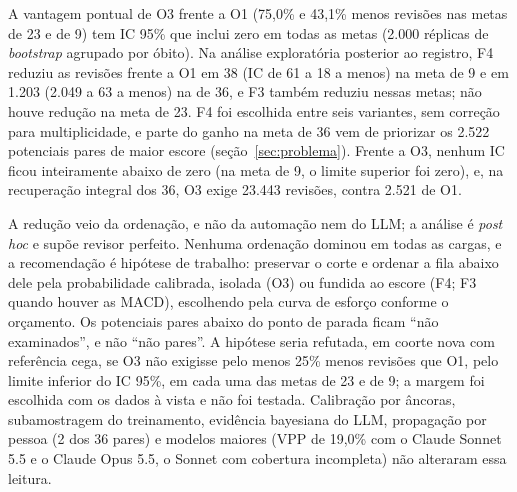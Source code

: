 \documentclass[12pt,a4paper]{article}
\begin{document}
A vantagem pontual de O3 frente a O1 (75,0\% e 43,1\% menos revisões nas metas de 23 e de 9) tem IC 95\% que inclui zero em todas as metas (2.000 réplicas de \textit{bootstrap} agrupado por óbito). %
Na análise exploratória posterior ao registro, F4 reduziu as revisões frente a O1 em 38 (IC de 61 a 18 a menos) na meta de 9 e em 1.203 (2.049 a 63 a menos) na de 36, e F3 também reduziu nessas metas; não houve redução na meta de 23. %
F4 foi escolhida entre seis variantes, sem correção para multiplicidade, e parte do ganho na meta de 36 vem de priorizar os 2.522 potenciais pares de maior escore (seção~\ref{sec:problema}). Frente a O3, nenhum IC ficou inteiramente abaixo de zero (na meta de 9, o limite superior foi zero), e, na recuperação integral dos 36, O3 exige 23.443 revisões, contra 2.521 de O1. %

A redução veio da ordenação, e não da automação nem do LLM; a análise é \textit{post hoc} e supõe revisor perfeito. Nenhuma ordenação dominou em todas as cargas, e a recomendação é hipótese de trabalho: preservar o corte e ordenar a fila abaixo dele pela probabilidade calibrada, isolada (O3) ou fundida ao escore (F4; F3 quando houver as MACD), escolhendo pela curva de esforço conforme o orçamento. Os potenciais pares abaixo do ponto de parada ficam ``não examinados'', e não ``não pares''. A hipótese seria refutada, em coorte nova com referência cega, se O3 não exigisse pelo menos 25\% menos revisões que O1, pelo limite inferior do IC 95\%, em cada uma das metas de 23 e de 9; a margem foi escolhida com os dados à vista e não foi testada. %
Calibração por âncoras, subamostragem do treinamento, evidência bayesiana do LLM, propagação por pessoa (2 dos 36 pares) e modelos maiores (VPP de 19,0\% com o Claude Sonnet 5.5 e o Claude Opus 5.5, o Sonnet com cobertura incompleta) não alteraram essa leitura. %
\end{document}
